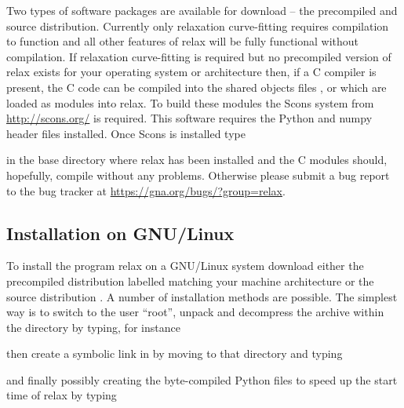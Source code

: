 Two types of software packages are available for download -- the precompiled and source distribution.
Currently only relaxation curve-fitting requires compilation to function and all other features of relax will be fully functional without compilation.
If relaxation curve-fitting is required but no precompiled version of relax exists for your operating system or architecture then, if a C compiler is present, the C code can be compiled into the shared objects files ,  or  which are loaded as modules into relax.
To build these modules the Scons system from \href{http://scons.org/}{http://scons.org/} is required.
This software requires the Python and numpy header files installed.
Once Scons is installed type


in the base directory where relax has been installed and the C modules should, hopefully, compile without any problems.
Otherwise please submit a bug report to the bug tracker at \href{https://gna.org/bugs/?group=relax}{https://gna.org/bugs/?group=relax}.



\subsection{Installation on GNU/Linux}

To install the program relax on a GNU/Linux system download either the precompiled distribution labelled  matching your machine architecture or the source distribution .
A number of installation methods are possible.
The simplest way is to switch to the user ``root'', unpack and decompress the archive within the  directory by typing, for instance


then create a symbolic link in  by moving to that directory and typing


and finally possibly creating the byte-compiled Python  files to speed up the start time of relax by typing


